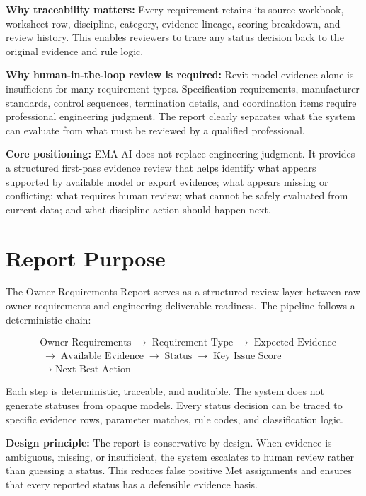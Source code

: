\documentclass[10pt,letterpaper]{article}
\newcommand{\strong}[1]{\textbf{\textcolor{emaNavy}{#1}}}
\newcommand{\guardrailbox}[1]{%
\begin{tcolorbox}[colback=guardrailBlue,colframe=guardrailBorder,
    boxrule=0.6pt,arc=2mm,left=10pt,right=10pt,top=8pt,bottom=8pt]\small #1%
\end{tcolorbox}}
\newcommand{\keyconcept}[1]{%
\begin{tcolorbox}[colback=emaSoft,borderline west={3pt}{0pt}{emaBlue}]\small #1%
\end{tcolorbox}}
\newcommand{\flowarrow}{\ensuremath{\;\boldsymbol{\rightarrow}\;}}
\begin{document}
\strong{Why traceability matters:} Every requirement retains its source workbook, worksheet row,
discipline, category, evidence lineage, scoring breakdown, and review history. This enables
reviewers to trace any status decision back to the original evidence and rule logic.

\strong{Why human-in-the-loop review is required:} Revit model evidence alone is insufficient for
many requirement types. Specification requirements, manufacturer standards, control sequences,
termination details, and coordination items require professional engineering judgment. The report
clearly separates what the system can evaluate from what must be reviewed by a qualified
professional.

\guardrailbox{\strong{Core positioning:} EMA AI does not replace engineering judgment. It provides a
  structured first-pass evidence review that helps identify what appears supported by available model
  or export evidence; what appears missing or conflicting; what requires human review; what cannot
  be safely evaluated from current data; and what discipline action should happen next.}

\section{Report Purpose}

The Owner Requirements Report serves as a structured review layer between raw owner requirements and
engineering deliverable readiness. The pipeline follows a deterministic chain:

\[
\begin{aligned}
&\text{Owner Requirements} \flowarrow \text{Requirement Type} \flowarrow \text{Expected Evidence}\\
&\flowarrow \text{Available Evidence} \flowarrow \text{Status} \flowarrow \text{Key Issue Score}\\
&\flowarrow \text{Next Best Action}
\end{aligned}
\]

Each step is deterministic, traceable, and auditable. The system does not generate statuses from
opaque models. Every status decision can be traced to specific evidence rows, parameter matches,
rule codes, and classification logic.

\keyconcept{\strong{Design principle:} The report is conservative by design. When evidence is
  ambiguous, missing, or insufficient, the system escalates to human review rather than guessing a
  status. This reduces false positive Met assignments and ensures that every reported status has a
  defensible evidence basis.}
\end{document}
